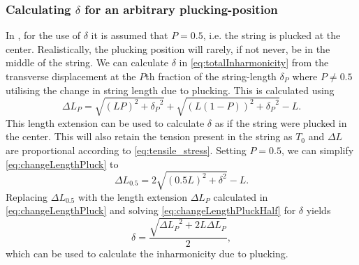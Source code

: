 \documentclass{article}
\begin{document}
\begin{sloppy}
\subsubsection{Calculating $\delta$ for an arbitrary plucking-position}
In \cite{rossing:science_of_string_instruments}, for the use of $\delta$ it is assumed that $P=0.5$, i.e. the string is plucked at the center. Realistically, the plucking position will rarely, if not never, be in the middle of the string. We can calculate $\delta$ in \eqref{eq:totalInharmonicity} from the transverse displacement at the $P$th fraction of the string-length $\delta_P$ where $P \neq 0.5$ utilising the change in string length due to plucking. This is calculated using
\begin{equation}\label{eq:changeLengthPluck}
    \Delta L_P = \sqrt{(LP)^2+{\delta_P}^2}+\sqrt{(L(1-P))^2+{\delta_P}^2} - L.
\end{equation}
This length extension can be used to calculate $\delta$ as if the string were plucked in the center. This will also retain the tension present in the string as $T_0$ and $\Delta L$ are proportional according to \eqref{eq:tensile_stress}. Setting $P = 0.5$, we can simplify \eqref{eq:changeLengthPluck} to
%
\begin{equation}\label{eq:changeLengthPluckHalf}
    \Delta L_{0.5} = 2\sqrt{(0.5L)^2 + \delta^2} - L.
\end{equation}
%
Replacing $\Delta L_{0.5}$ with the length extension $\Delta L_P$ calculated in \eqref{eq:changeLengthPluck} and solving \eqref{eq:changeLengthPluckHalf} for $\delta$ yields
\begin{equation}
    \delta = \frac{\sqrt{{\Delta L_P}^2+2L\Delta L_P}}{2},
\end{equation}
which can be used to calculate the inharmonicity due to plucking.


\end{sloppy}
\end{document}
